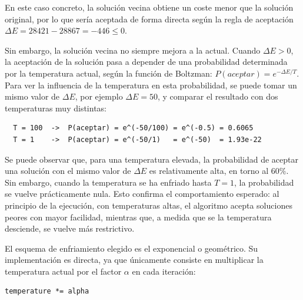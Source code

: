 En este caso concreto, la solución vecina obtiene un coste menor que la solución original, por lo que sería aceptada de forma
directa según la regla de aceptación $\Delta E = 28421 - 28867 = -446 \leq 0$. 

Sin embargo, la solución vecina no siempre mejora a la actual. Cuando $\Delta E > 0$, la aceptación de la solución pasa a 
depender de una probabilidad determinada por la temperatura actual, según la función de Boltzman: $P(aceptar) = e^{-\Delta 
E/T}$. Para ver la influencia de la temperatura en esta probabilidad, se puede tomar un mismo valor de $\Delta E$, por 
ejemplo $\Delta E = 50$, y comparar el resultado con dos temperaturas muy distintas:

\begin{verbatim}
  T = 100  ->  P(aceptar) = e^(-50/100) = e^(-0.5) = 0.6065
  T = 1    ->  P(aceptar) = e^(-50/1)   = e^(-50)  = 1.93e-22
\end{verbatim}

Se puede observar que, para una temperatura elevada, la probabilidad de aceptar una solución con el mismo valor de $\Delta E$
es relativamente alta, en torno al $60\%$. Sin embargo, cuando la temperatura se ha enfriado hasta $T=1$, la probabilidad se
vuelve prácticamente nula. Esto confirma el comportamiento esperado: al principio de la ejecución, con temperaturas altas, el 
algoritmo acepta soluciones peores con mayor facilidad, mientras que, a medida que se la temperatura desciende, se vuelve 
más restrictivo.

El esquema de enfriamiento elegido es el exponencial o geométrico. Su implementación es directa, ya que únicamente consiste en
multiplicar la temperatura actual por el factor $\alpha$ en cada iteración:
\newline
\begin{lstlisting}[style=PythonStyle]
  temperature *= alpha
\end{lstlisting}

